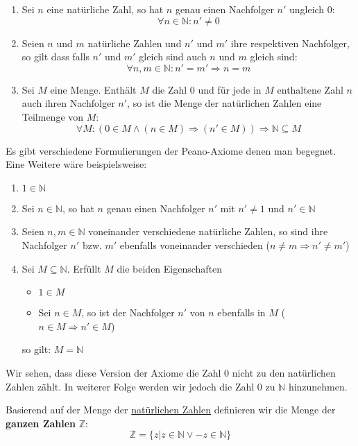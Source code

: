 \documentclass[../../main.tex]{subfiles}
\begin{document}
\begin{definition}
\begin{enumerate}
				\item Sei $n$ eine natürliche Zahl, so hat $n$ genau einen Nachfolger $n'$ ungleich 0: $$\forall n \in \mathbb{N}: n' \not= 0$$
				\item Seien $n$ und $m$ natürliche Zahlen und $n'$ und $m'$ ihre respektiven Nachfolger, so gilt dass falls $n'$ und $m'$ gleich sind auch $n$ und $m$ gleich sind: $$\forall n,m \in \mathbb{N}: n' = m' \Rightarrow n=m$$
				\item Sei $M$ eine Menge. Enthält $M$ die Zahl 0 und für jede in $M$ enthaltene Zahl $n$ auch ihren Nachfolger $n'$, so ist die Menge der natürlichen Zahlen eine Teilmenge von $M$: $$\forall M: (0 \in M \land (n \in M) \Rightarrow (n' \in M)) \Rightarrow \mathbb{N} \subseteq M$$
			\end{enumerate}
			Es gibt verschiedene Formulierungen der Peano-Axiome denen man begegnet. Eine Weitere wäre beispielsweise:
			\begin{enumerate}
				\item $1 \in \mathbb{N}$
				\item Sei $n \in \mathbb{N}$, so hat $n$ genau einen Nachfolger $n'$ mit $n' \not=1$ und $n' \in \mathbb{N}$
				\item Seien $n,m \in \mathbb{N}$ voneinander verschiedene natürliche Zahlen, so sind ihre Nachfolger $n'$ bzw. $m'$ ebenfalls voneinander verschieden ($n \not= m \Rightarrow n' \not=m'$)
				\item Sei $M \subseteq \mathbb{N}$. Erfüllt $M$ die beiden Eigenschaften
					\begin{itemize}
						\item $1 \in M$
						\item Sei $n \in M$, so ist der Nachfolger $n'$ von $n$ ebenfalls in $M$ ($n \in M \Rightarrow n' \in M$)
					\end{itemize}
				so gilt: $M = \mathbb{N}$
			\end{enumerate}
			Wir sehen, dass diese Version der Axiome die Zahl 0 nicht zu den natürlichen Zahlen zählt. In weiterer Folge werden wir jedoch die Zahl 0 zu $\mathbb{N}$ hinzunehmen.
		\end{definition}
	
		\begin{definition}
			\label{def:GanzeZahlen}
			Basierend auf der Menge der \hyperref[def:NatürlicheZahlen]{natürlichen Zahlen} definieren wir die Menge der \textbf{ganzen Zahlen } $\mathbb{Z}$: $$\mathbb{Z} = \{z|z \in \mathbb{N} \lor -z \in \mathbb{N}\}$$
		\end{definition}
	
\end{document}
